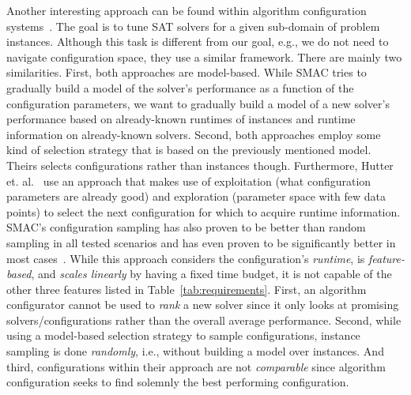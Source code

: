 \documentclass[runningheads]{llncs}
\begin{document}
Another interesting approach can be found within algorithm configuration systems~\cite{HutterHL11,HoosHL21,Stutzle0P22}.
The goal is to tune SAT solvers for a given sub-domain of problem instances.
Although this task is different from our goal, e.g., we do not need to navigate configuration space, they use a similar framework.
There are mainly two similarities.
First, both approaches are model-based.
While SMAC tries to gradually build a model of the solver's performance as a function of the configuration parameters, we want to gradually build a model of a new solver's performance based on already-known runtimes of instances and runtime information on already-known solvers.
Second, both approaches employ some kind of selection strategy that is based on the previously mentioned model.
Theirs selects configurations rather than instances though.
Furthermore, Hutter et. al.~\cite{HutterHL11} use an approach that makes use of exploitation (what configuration parameters are already good) and exploration (parameter space with few data points) to select the next configuration for which to acquire runtime information.
SMAC's configuration sampling has also proven to be better than random sampling in all tested scenarios and has even proven to be significantly better in most cases~\cite{HutterHL11}.
While this approach considers the configuration's \emph{runtime}, is \emph{feature-based}, and \emph{scales linearly} by having a fixed time budget, it is not capable of the other three features listed in Table~\ref{tab:requirements}.
First, an algorithm configurator cannot be used to \emph{rank} a new solver since it only looks at promising solvers/configurations rather than the overall average performance.
Second, while using a model-based selection strategy to sample configurations, instance sampling is done \emph{randomly}, i.e., without building a model over instances.
And third, configurations within their approach are not \emph{comparable} since algorithm configuration seeks to find solemnly the best performing configuration.
\end{document}
